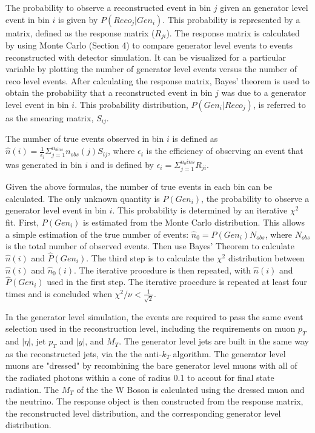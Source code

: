 \documentclass[oneside, letterpaper, oldfontcommands]{memoir}
\begin{document}
\qquad The probability to observe a reconstructed event in bin $j$ given an generator level event in bin $i$ is given by $P(Reco_{j}|Gen_{i})$. This probability is represented by a matrix, defined as the response matrix ($R_{ji}$). The response matrix is calculated by using Monte Carlo (Section 4) to compare generator level events to events reconstructed with detector simulation. It can be visualized for a particular variable by plotting the number of generator level events versus the number of reco level events. After calculating the response matrix, Bayes' theorem is used to obtain the probability that a reconstructed event in bin $j$ was due to a generator level event in bin $i$. This probability distribution, $P(Gen_{i}|Reco_{j})$, is referred to as the smearing matrix, $S_{ij}$.

\qquad The number of true events observed in bin $i$ is defined as $\hat{n}(i) = \frac{1}{\epsilon_{i}}\Sigma_{j=1}^{n_{bins}}n_{obs}(j)S_{ij}$, where $\epsilon_{i}$ is the efficiency of observing an event that was generated in bin $i$ and is defined by $\epsilon_{i}=\Sigma_{j=1}^{n_bins}R_{ji}$.

\qquad Given the above formulas, the number of true events in each bin can be calculated. The only unknown quantity is $P(Gen_{i})$, the probability to observe a generator level event in bin $i$. This probability is determined by an iterative $\chi^2$ fit. First, $P(Gen_{i})$ is estimated from the Monte Carlo distribution. This allows a simple estimation of the true number of events: $\hat{n}_{0} = P(Gen_{i})N_{obs}$, where $N_{obs}$ is the total number of observed events. Then use Bayes' Theorem to calculate $\hat{n}(i)$ and $\hat{P}(Gen_{i})$. The third step is to calculate the $\chi^{2}$ distribution between $\hat{n}(i)$ and $\hat{n}_{0}(i)$. The iterative procedure is then repeated, with $\hat{n}(i)$ and $\hat{P}(Gen_{i})$ used in the first step. The iterative procedure is repeated at least four times and is concluded when $\chi^{2}/\nu < \frac{1}{\sqrt{2}}$.

\qquad In the generator level simulation, the events are required to pass the same event selection used in the reconstruction level, including the requirements on muon $p_{T}$ and $|\eta|$, jet $p_{T}$ and $|y|$, and $M_{T}$. The generator level jets are built in the same way as the reconstructed jets, via the the anti-$k_{T}$ algorithm. The generator level muons are "dressed" by recombining the bare generator level muons with all of the radiated photons within a cone of radius 0.1 to accout for final state radiation. The $M_{T}$ of the the W Boson is calculated using the dressed muon and the neutrino. The response object is then constructed from the response matrix, the reconstructed level distribution, and the corresponding generator level distribution. 
\end{document}
